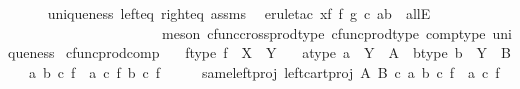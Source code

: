 \begin{isabellebody}
\ \ \ \ \isamarkupfalse%
\ uniqueness\ left{\isacharunderscore}{\kern0pt}eq\ right{\isacharunderscore}{\kern0pt}eq\ assms\ \isamarkupfalse%
\ {\isacharparenleft}{\kern0pt}erule{\isacharunderscore}{\kern0pt}tac\ x{\isacharequal}{\kern0pt}{\isachardoublequoteopen}f\ {\isasymtimes}\isactrlsub f\ g\ {\isasymcirc}\isactrlsub c\ {\isasymlangle}a{\isacharcomma}{\kern0pt}b{\isasymrangle}{\isachardoublequoteclose}\ \ allE{\isacharcomma}{\kern0pt}\isanewline
\ \ \ \ \ \ \ \ \ \ \ \ \ \ \ \ \ \ \ \ \ \ meson\ cfunc{\isacharunderscore}{\kern0pt}cross{\isacharunderscore}{\kern0pt}prod{\isacharunderscore}{\kern0pt}type\ cfunc{\isacharunderscore}{\kern0pt}prod{\isacharunderscore}{\kern0pt}type\ comp{\isacharunderscore}{\kern0pt}type\ uniqueness{\isacharparenright}{\kern0pt}\isanewline
{}\isamarkupfalse%
%
\endisatagproof
{\isafoldproof}%
%
\isadelimproof
\isanewline
%
\endisadelimproof
\isanewline
{}\isamarkupfalse%
\ cfunc{\isacharunderscore}{\kern0pt}prod{\isacharunderscore}{\kern0pt}comp{\isacharcolon}{\kern0pt}\isanewline
\ \ \ f{\isacharunderscore}{\kern0pt}type{\isacharcolon}{\kern0pt}\ {\isachardoublequoteopen}f\ {\isacharcolon}{\kern0pt}\ X\ {\isasymrightarrow}\ Y{\isachardoublequoteclose}\isanewline
\ \ \ a{\isacharunderscore}{\kern0pt}type{\isacharcolon}{\kern0pt}\ {\isachardoublequoteopen}a\ {\isacharcolon}{\kern0pt}\ Y\ {\isasymrightarrow}\ A{\isachardoublequoteclose}\ \ b{\isacharunderscore}{\kern0pt}type{\isacharcolon}{\kern0pt}\ {\isachardoublequoteopen}b\ {\isacharcolon}{\kern0pt}\ Y\ {\isasymrightarrow}\ B{\isachardoublequoteclose}\isanewline
\ \ \ {\isachardoublequoteopen}{\isasymlangle}a{\isacharcomma}{\kern0pt}\ b{\isasymrangle}\ {\isasymcirc}\isactrlsub c\ f\ {\isacharequal}{\kern0pt}\ {\isasymlangle}a\ {\isasymcirc}\isactrlsub c\ f{\isacharcomma}{\kern0pt}\ b\ {\isasymcirc}\isactrlsub c\ f{\isasymrangle}{\isachardoublequoteclose}\isanewline
%
\isadelimproof
%
\endisadelimproof
%
\isatagproof
{}\isamarkupfalse%
\ {\isacharminus}{\kern0pt}\isanewline
\ \ \isamarkupfalse%
\ same{\isacharunderscore}{\kern0pt}left{\isacharunderscore}{\kern0pt}proj{\isacharcolon}{\kern0pt}\ {\isachardoublequoteopen}left{\isacharunderscore}{\kern0pt}cart{\isacharunderscore}{\kern0pt}proj\ A\ B\ {\isasymcirc}\isactrlsub c\ {\isasymlangle}a{\isacharcomma}{\kern0pt}\ b{\isasymrangle}\ {\isasymcirc}\isactrlsub c\ f\ {\isacharequal}{\kern0pt}\ a\ {\isasymcirc}\isactrlsub c\ f{\isachardoublequoteclose}\isanewline

\end{isabellebody}
